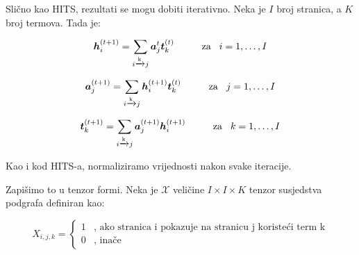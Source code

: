 \documentclass[11pt]{article}
\begin{document}
\begin{flushleft}
Slično kao HITS, rezultati se mogu dobiti iterativno. Neka je $I$ broj stranica, a $K$ broj termova. Tada je:
\end{flushleft}

\begin{equation}\label{eq:3}
    \boldsymbol{h}_{i}^{(t+1)} = \displaystyle\sum_{i \xrightarrow{\text{k}} j} \boldsymbol{a}_j^{t} \boldsymbol{t}_{k}^{(t)} \hspace{1cm} \text{za} \hspace{0.3cm} i = 1, \ldots, I
\end{equation}

\begin{equation}\label{eq:4}
    \boldsymbol{a}_{j}^{(t+1)} = \displaystyle\sum_{i \xrightarrow{\text{k}} j} \boldsymbol{h}_i^{(t+1)} \boldsymbol{t}_{k}^{(t)} \hspace{1cm} \text{za} \hspace{0.3cm} j = 1, \ldots, I
\end{equation}

\begin{equation}\label{eq:5}
    \boldsymbol{t}_{k}^{(t+1)} = \displaystyle\sum_{i \xrightarrow{\text{k}} j} \boldsymbol{a}_j^{(t+1)} \boldsymbol{h}_i^{(t+1)} \hspace{1cm} \text{za} \hspace{0.3cm} k = 1, \ldots, I
\end{equation}

\begin{raggedleft}
Kao i kod HITS-a, normaliziramo vrijednosti nakon svake iteracije.
\end{raggedleft}

\begin{flushleft}
Zapišimo to u tenzor formi. Neka je $\boldsymbol{\mathcal{X}}$  veličine $I \times I \times K $ tenzor susjedstva podgrafa definiran kao:
\end{flushleft}

\begin{equation}\label{eq:6}
    X_{i,j, k} =  \left\{
	\begin{array}{ll}
		1  & \mbox{, ako stranica i pokazuje na stranicu j koristeći term k} \\
		0 & \mbox{, inače }
	\end{array}
\right.
\end{equation}
\end{document}
